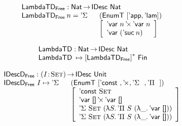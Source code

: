 \documentclass[preprint, authoryear, onecolumn]{sigplanconf}
\begin{document}



\[\stk{
\LambdaTFreeD : \Nat \To \IDesc{\Nat} \\
\begin{array}{@{}ll}
\LambdaTFreeD\: n = \DSigma{}{} & (\EnumT [ \LambdaTApp, \LambdaTLam ]) \\
                                & \left[\begin{array}{l}
                                  \DProd{\DVar{n}}{\DVar{n}} \\
                                  \DVar{(\NatSuc{n})}
                                  \end{array}\right]
\end{array}
}\]

\[\stk{
\LambdaTD : \Nat \To \IDesc{\Nat} \\
\LambdaTD\: \mapsto \FreeMonad{[\LambdaTFreeD]}{\Fin{}}
}\]


\[\stk{
\IDescFreeD : \PI{\V{I}}{\Set} \IDesc{\Unit} \\
\begin{array}{@{}ll}
\IDescFreeD~I \mapsto \DSigma{}{} & (\EnumT [ \DConst{},
                                              \DProd{}{},
                                              \DSigma{}{}, 
                                              \DPi{}{} ]) \\
                                  & \left[\begin{array}{l}
                                        \DConst{\Set}               \\
                                        \DProd{\DVar{\Void}}{\DVar{\Void}}  \\
                                        \DSigma{\Set}{(\LAM{S} \DPi{S}{(\LAM{\_} \DVar{\Void})})} \\
                                        \DSigma{\Set}{(\LAM{S} \DPi{S}{(\LAM{\_} \DVar{\Void})})}
                                    \end{array}\right]
\end{array}
}\]
\end{document}

